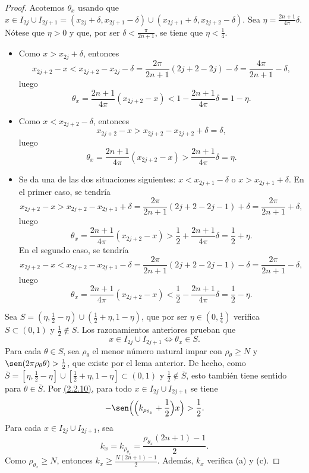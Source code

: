 \documentclass[a4paper, 12pt, oneside]{book}
\begin{document}
\begin{proof}
    Acotemos $\theta_x$ usando que $x \in I_{2j}\cup I_{2j+1}= (x_{2j}+\delta,x_{2j+1}-\delta) \cup (x_{2j+1}+\delta,x_{2j+2}-\delta)$. Sea $\eta = \frac{2n+1}{4\pi}\delta$. Nótese que $\eta > 0$ y que, por ser $\delta < \frac{\pi}{2n+1}$, se tiene que $\eta < \frac{1}{4}$.
    \begin{itemize}
        \item Como $x > x_{2j}+\delta$, entonces
        \[x_{2j+2}-x < x_{2j+2}-x_{2j}-\delta = \frac{2\pi}{2n+1}(2j+2-2j)-\delta = \frac{4\pi}{2n+1}-\delta,\]
        luego 
        \[\theta_x = \frac{2n+1}{4\pi}(x_{2j+2}-x) < 1-\frac{2n+1}{4\pi}\delta = 1-\eta.\]
        \item Como $x < x_{2j+2}-\delta$, entonces
        \[x_{2j+2}-x > x_{2j+2}-x_{2j+2}+\delta = \delta,\]
        luego
        \[\theta_x = \frac{2n+1}{4\pi}(x_{2j+2}-x) > \frac{2n+1}{4\pi}\delta = \eta.\]
        \item Se da una de las dos situaciones siguientes: $x < x_{2j+1}-\delta$ o $x > x_{2j+1}+\delta$. En el primer caso, se tendría
        \[x_{2j+2}-x > x_{2j+2}-x_{2j+1}+\delta = \frac{2\pi}{2n+1}(2j+2-2j-1)+\delta = \frac{2\pi}{2n+1}+\delta,\]
        luego
        \[\theta_x = \frac{2n+1}{4\pi}(x_{2j+2}-x) > \frac{1}{2}+\frac{2n+1}{4\pi}\delta = \frac{1}{2}+\eta.\]
        En el segundo caso, se tendría
        \[x_{2j+2}-x < x_{2j+2}-x_{2j+1}-\delta = \frac{2\pi}{2n+1}(2j+2-2j-1)-\delta = \frac{2\pi}{2n+1}- \delta,\]
        luego
        \[\theta_x = \frac{2n+1}{4\pi}(x_{2j+2}-x) < \frac{1}{2}-\frac{2n+1}{4\pi}\delta = \frac{1}{2}-\eta.\]
    \end{itemize}

    Sea $S = (\eta,\frac{1}{2}-\eta) \cup (\frac{1}{2}+\eta,1-\eta)$, que por ser $\eta \in (0,\frac{1}{4})$ verifica $S \subset (0,1)$ y $\frac{1}{2}\not\in S$. Los razonamientos anteriores prueban que
    \[x \in I_{2j} \cup I_{2j+1} \iff \theta_x \in S.\]
    Para cada $\theta \in S$, sea $\rho_\theta$ el menor número natural impar con $\rho_\theta \geq N$ y $\sen(2\pi\rho_\theta\theta) > \frac{1}{2}$, que existe por el lema anterior. De hecho, como $\overline{S} = [\eta,\frac{1}{2}-\eta] \cup [\frac{1}{2}+\eta,1-\eta] \subset (0,1)$ y $\frac{1}{2}\not\in\overline{S}$, esto también tiene sentido para $\theta \in \overline{S}$. Por \hyperref[2.2.10]{\color{blue}(2.2.10)}, para todo $x \in I_{2j} \cup I_{2j+1}$ se tiene
    \[-\sen\Bigl(\Bigl(k_{\rho_{\theta_x}}+\frac{1}{2}\Bigr)x\Bigr) > \frac{1}{2}.\]
    Para cada $x \in I_{2j} \cup I_{2j+1}$, sea
    \[k_x = k_{\rho_{\theta_x}} = \frac{\rho_{\theta_x}(2n+1)-1}{2}.\] Como $\rho_{\theta_x} \geq N$, entonces $k_x \geq \frac{N(2n+1)-1}{2}$. Además, $k_x$ verifica (a) y (c). 


\end{proof}
\end{document}

